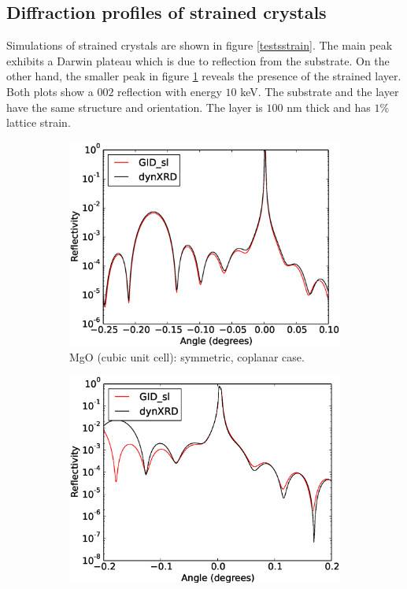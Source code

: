 \documentclass[12pt,oneside,notitlepage,abstracton,a4paper]{scrartcl}
\begin{document}
\newpage
\subsection{Diffraction profiles of strained crystals}\label{res2}

Simulations of strained crystals are shown in figure \ref{testsstrain}. The main peak exhibits a Darwin plateau which is due to reflection from the substrate. On the other hand, the smaller peak in figure \ref{test12} reveals the presence of the strained layer. Both plots show a $002$ reflection with energy $10$ keV. The substrate and the layer have the same structure and orientation. The layer is $100$ nm thick and has $1\%$ lattice strain.
\begin{figure}[h]
 \centering
 \begin{subfigure}[h]{0.49\textwidth}
  \includegraphics[width=\textwidth]{pics/test12.eps}
  \caption{MgO (cubic unit cell): symmetric, coplanar case.}\label{test12}
  \label{test12}
 \end{subfigure}
 \begin{subfigure}[h]{0.49\textwidth}
  \includegraphics[width=\textwidth]{pics/test14.eps}

\end{subfigure}
\end{figure}
\end{document}
